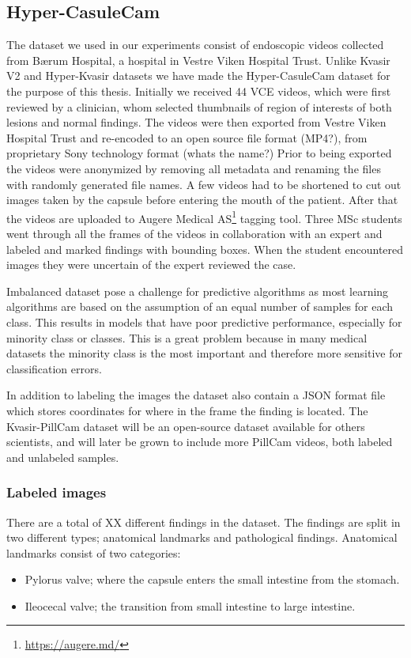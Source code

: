 \documentclass[thesis.tex]{subfiles}
\begin{document}
\subsection{Hyper-CasuleCam} \label{sec:hyper-capsulecam}
The dataset we used in our experiments consist of endoscopic videos collected from Bærum Hospital, a hospital in Vestre Viken Hospital Trust. Unlike Kvasir V2 and Hyper-Kvasir datasets we have made the Hyper-CasuleCam dataset for the purpose of this thesis. Initially we received 44 VCE videos, which were first reviewed by a clinician, whom selected thumbnails of region of interests of both lesions and normal findings. The videos were then exported from Vestre Viken Hospital Trust and re-encoded to an open source file format (MP4?), from proprietary Sony technology format (whats the name?) %
Prior to being exported the videos were anonymized by removing all metadata and renaming the files with randomly generated file names. A few videos had to be shortened to cut out images taken by the capsule before entering the mouth of the patient. After that the videos are uploaded to Augere Medical AS\footnote{\url{https://augere.md/}} tagging tool. Three MSc students went through all the frames of the videos in collaboration with an expert and labeled and marked findings with bounding boxes. When the student encountered images they were uncertain of the expert reviewed the case.

Imbalanced dataset pose a challenge for predictive algorithms as most learning algorithms are based on the assumption of an equal number of samples for each class. This results in models that have poor predictive performance, especially for minority class or classes. This is a great problem because in many medical datasets the minority class is the most important and therefore more sensitive for classification errors.

In addition to labeling the images the dataset also contain a JSON format file which stores coordinates for where in the frame the finding is located. The Kvasir-PillCam dataset will be an open-source dataset available for others scientists, and will later be grown to include more PillCam videos, both labeled and unlabeled samples.




\subsubsection{Labeled images}
There are a total of XX different findings in the dataset. The findings are split in two different types; anatomical landmarks and pathological findings. Anatomical landmarks consist of two categories:
\begin{itemize}
\item Pylorus valve; where the capsule enters the small intestine from the stomach.
\item Ileocecal valve; the transition from small intestine to large intestine. 
\end{itemize}
\end{document}
